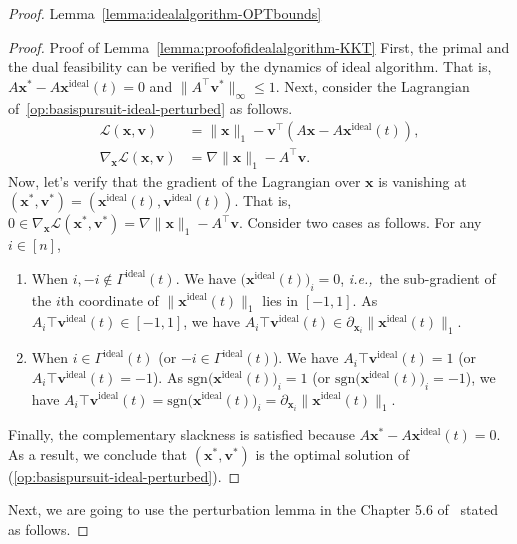 \documentclass[11pt]{article}
\theoremstyle{remark}
\theoremstyle{definition}
\newcommand{\bx}{\mathbf{x}}
\newcommand{\bv}{\mathbf{v}}
\newcommand{\ie} {{\it i.e.,\ }}
\begin{document}
\begin{proof}{Lemma~\ref{lemma:idealalgorithm-OPTbounds}}
\begin{proof}{Proof of Lemma~\ref{lemma:proofofidealalgorithm-KKT}}
		First, the primal and the dual feasibility can be verified by the dynamics of ideal algorithm. That is, $A\bx^*-A\bx^{\text{ideal}}(t)=0$ and $\|A^\top\bv^*\|_{\infty}\leq1$. Next, consider the Lagrangian of~\eqref{op:basispursuit-ideal-perturbed} as follows.
		\begin{align*}
		\mathcal{L}(\bx,\bv) &= \|\bx\|_1 - \bv^\top (A\bx-A\bx^{\text{ideal}}(t)),\\
		\nabla_{\bx}\mathcal{L}(\bx,\bv) &= \nabla\|\bx\|_1-A^\top \bv.
		\end{align*}
		Now, let's verify that the gradient of the Lagrangian over $\bx$ is vanishing at $(\bx^*,\bv^*) = (\bx^{\text{ideal}}(t),\bv^{\text{ideal}}(t))$. That is,  $0\in\nabla_{\bx}\mathcal{L}(\bx^*,\bv^*)=\nabla\|\bx\|_1-A^\top \bv$. Consider two cases as follows. For any $i\in[n]$,
		\begin{enumerate}[label=(\arabic*)]
			\item When $i,-i\notin\Gamma^{\text{ideal}}(t)$. We have $\Big(\bx^{\text{ideal}}(t) \Big)_i=0$, \ie the sub-gradient of the $i$th coordinate of $\|\bx^{\text{ideal}}(t)\|_1$ lies in $[-1,1]$. As $A_i\top\bv^{\text{ideal}}(t)\in[-1,1]$, we have $A_i\top\bv^{\text{ideal}}(t)\in\partial_{\bx_i}\|\bx^{\text{ideal}}(t)\|_1$.
			\item When $i\in\Gamma^{\text{ideal}}(t)$ (or $-i\in\Gamma^{\text{ideal}}(t)$). We have $A_i\top\bv^{\text{ideal}}(t)=1$ (or $A_i\top\bv^{\text{ideal}}(t)=-1$). As $\text{sgn}\Big(\bx^{\text{ideal}}(t) \Big)_i=1$ (or $\text{sgn}\Big(\bx^{\text{ideal}}(t) \Big)_i=-1$), we have $A_i\top\bv^{\text{ideal}}(t)=\text{sgn}\Big(\bx^{\text{ideal}}(t) \Big)_i=\partial_{\bx_i}\|\bx^{\text{ideal}}(t)\|_1$.
		\end{enumerate}
		Finally, the complementary slackness is satisfied because $A\bx^*-A\bx^{\text{ideal}}(t)=0$.
		As a result, we conclude that $(\bx^*,\bv^*)$ is the optimal solution of (\ref{op:basispursuit-ideal-perturbed}).
	\end{proof}
	
	Next, we are going to use the perturbation lemma in the Chapter 5.6 of~\cite{boyd2004convex} stated as follows.
	

\end{proof}
\end{document}

